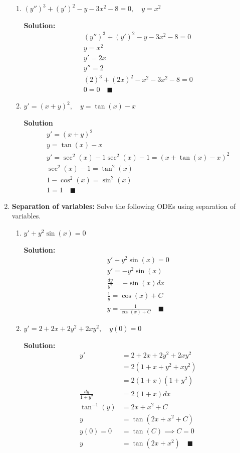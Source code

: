 \documentclass[letterpaper, fontsize=11pt]{scrartcl} %
\numberwithin{equation}{section} %
\numberwithin{figure}{section} %
\numberwithin{table}{section} %
\begin{document}
\begin{enumerate}
\begin{enumerate}
\item $(y'')^3 + (y')^2 - y - 3x^2 - 8 = 0, \quad y = x^2$
\par \textbf{Solution:}
\begin{gather*}
(y'')^3 + (y')^2 - y - 3x^2 - 8 = 0\\
y = x^2\\
y' = 2x\\
y'' = 2\\
(2)^3 + (2x)^2 - x^2 - 3x^2 -8 = 0\\
0 = 0 \quad\blacksquare
\end{gather*}

\item $y' = (x+y)^2,\quad y = \tan(x) - x$
\par \textbf{Solution}
\begin{gather*}
y' = (x+y)^2 \\
y = \tan(x) - x\\
y' = \sec^2(x) - 1
\sec^2(x) - 1 = (x+\tan(x) -x)^2\\
\sec^2(x)-1 = \tan^2(x) \\
1 - \cos^2(x) = \sin^2(x) \\
1 = 1\quad\blacksquare
\end{gather*}
\end{enumerate}

\item \textbf{Separation of variables:} Solve the following ODEs using separation of variables. 
\begin{enumerate}

\item $y' + y^2 \sin(x) = 0$ 
\par \textbf{Solution:}
\begin{gather*}
y' + y^2 \sin(x) = 0\\
y' = -y^2 \sin(x)\\
\frac{dy}{y^2} = -\sin(x)dx\\
\frac{1}{y} = \cos(x) + C\\
y = \frac{1}{\cos(x) + C}\quad\blacksquare
\end{gather*}

\item $y' =2+2x+2y^2 + 2xy^2, \quad y(0) = 0$
\par \textbf{Solution:}
\begin{align*}
y' &=2+2x+2y^2 + 2xy^2 \\
&= 2(1 + x + y^2 + xy^2)\\
&= 2(1+x)(1+y^2)\\
\frac{dy}{1+y^2} &= 2(1+x)dx\\
\tan^{-1}(y) &= 2x + x^2 + C\\
y &= \tan(2x + x^2 + C)\\
y(0) = 0&=  \tan( C) \implies C = 0\\
y&= \tan(2x + x^2) \quad\blacksquare
\end{align*}


\end{enumerate}
\end{enumerate}
\end{document}
